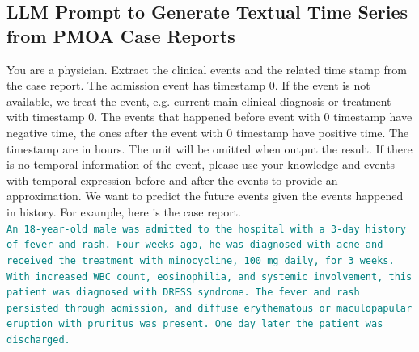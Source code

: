 \subsection{LLM Prompt to Generate Textual Time Series from PMOA Case Reports}
\label{apd:extraction-prompt}

\begin{tcolorbox}[
  colback=gray!5,
  colframe=gray!100,
  title=Prompt,
  boxrule=2pt,
  enhanced,
  breakable,                %
  before skip=8pt,          %
  after skip=8pt,           %
  pad at break*=2mm,        %
  fontupper=\scriptsize,
  title after break={Prompt} %
]
You are a physician. Extract the clinical events and the related time stamp from the case report. The admission event has timestamp 0. If the event is not available, we treat the event, e.g. current main clinical diagnosis or treatment with timestamp 0. The events that happened before event with 0 timestamp have negative time, the ones after the event with 0 timestamp have positive time. The timestamp are in hours. The unit will be omitted when output the result. If there is no temporal information of the event, please use your knowledge and events with temporal expression before and after the events to provide an approximation. We want to predict the future events given the events happened in history. For example, here is the case report.\\

\textcolor{teal}{\texttt{An 18-year-old male was admitted to the hospital with a 3-day history of fever and rash. Four weeks ago, he was diagnosed with acne and received the treatment with minocycline, 100 mg daily, for 3 weeks. With increased WBC count, eosinophilia, and systemic involvement, this patient was diagnosed with DRESS syndrome. The fever and rash persisted through admission, and diffuse erythematous or maculopapular eruption with pruritus was present. One day later the patient was discharged.}}\\


\end{tcolorbox}
